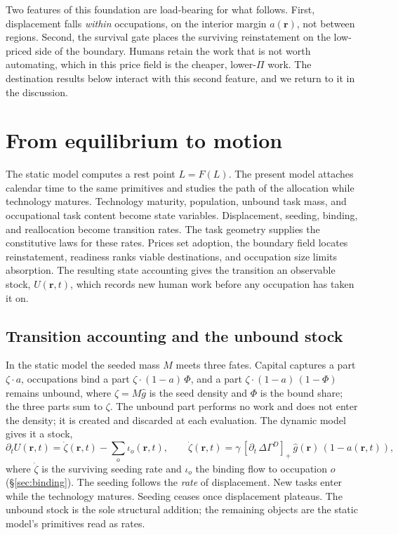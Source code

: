 \documentclass[12pt, a4paper]{article}
\newcommand{\rr}{\mathbf{r}}
\begin{document}
Two features of this foundation are load-bearing for what follows. First,
displacement falls \emph{within} occupations, on the interior margin
$a(\rr)$, not between regions. Second, the survival gate places the
surviving reinstatement on the low-priced side of the boundary. Humans
retain the work that is not worth automating, which in this price field
is the cheaper, lower-$\Pi$ work. The destination results below interact
with this second feature, and we return to it in the discussion.

\section{From equilibrium to motion}
\label{sec:motion}

The static model computes a rest point $L = F(L)$. The present model
attaches calendar time to the same primitives and studies the path of
the allocation while technology matures. Technology maturity, population,
unbound task mass, and occupational task content become state variables.
Displacement, seeding, binding, and reallocation become transition rates.
The task geometry supplies the constitutive laws for these rates. Prices
set adoption, the boundary field locates reinstatement, readiness ranks
viable destinations, and occupation size limits absorption. The resulting
state accounting gives the transition an observable stock, $U(\rr,t)$,
which records new human work before any occupation has taken it on.

\subsection{Transition accounting and the unbound stock}

In the static model the seeded mass $M$ meets three fates. Capital
captures a part $\zeta\cdot a$, occupations bind a part
$\zeta\cdot(1-a)\,\Phi$, and a part $\zeta\cdot(1-a)\,(1-\Phi)$ remains
unbound, where $\zeta = M\hat g$ is the seed density and $\Phi$ is the
bound share; the three parts sum to $\zeta$. The unbound part performs no work and does not enter the
density; it is created and discarded at each evaluation. The dynamic
model gives it a stock,
\begin{equation}
\partial_t U(\rr,t) = \dot\zeta(\rr,t) - \sum_o \iota_o(\rr,t),
\qquad
\dot\zeta(\rr,t) = \gamma\,[\partial_t\,\Delta\Gamma^D]_+\,\hat g(\rr)\,(1-a(\rr,t)),
\label{eq:Ustock}
\end{equation}
where $\dot\zeta$ is the surviving seeding rate and $\iota_o$ the binding flow to
occupation $o$ (\S\ref{sec:binding}). The seeding follows the
\emph{rate} of displacement. New tasks enter while the technology
matures. Seeding ceases once displacement plateaus. The unbound stock is
the sole structural addition; the remaining objects are the static
model's primitives read as rates.
\end{document}
